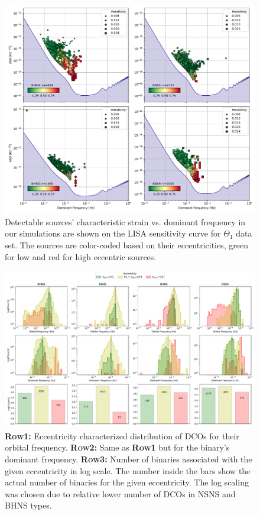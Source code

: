 \documentclass[journal, twocolumns]{IEEEtran}
\begin{document}
    \begin{figure}[!h]%
        \centering
        \includegraphics[width=\columnwidth]{analysis_data/004__images_for_latex/dco_typewise_snr}
        \caption{Detectable sources' characteristic strain vs. dominant frequency in our simulations are shown on the LISA sensitivity curve for $\Theta_1$ data set. The sources are color-coded based on their eccentricities, green for low and red for high eccentric sources.}
        \label{fig:alldcosnrplotting}
    \end{figure}

    \begin{figure}[!h]%
        \centering
        \includegraphics[width=0.9\columnwidth]{analysis_data/004__images_for_latex/dco_fdom_ecc_details}
        \caption{\textsc{\textbf{Row1:}} Eccentricity characterized distribution of DCOs for their orbital frequency. \textsc{\textbf{Row2:}} Same as \textsc{\textbf{Row1}} but for the binary's dominant frequency. \textsc{\textbf{Row3:}} Number of binaries associated with the given eccentricity in log scale. The number inside the bars show the actual number of binaries for the given eccentricity. The log scaling was chosen due to relative lower number of DCOs in NSNS and BHNS types.}
        \label{fig:dcofdomeccdetails}
    \end{figure}%
\end{document}
